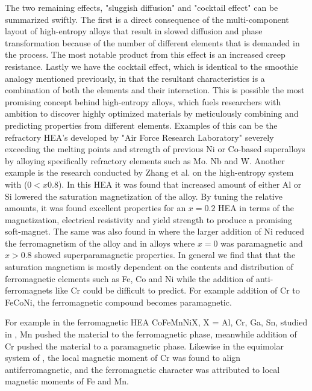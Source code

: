 The two remaining effects, "sluggish diffusion" and "cocktail effect" can be summarized swiftly. The first is a direct consequence of the multi-component layout of high-entropy alloys that result in slowed diffusion and phase transformation because of the number of different elements that is demanded in the process. The most notable product from this effect is an increased creep resistance. Lastly we have the cocktail effect, which is identical to the smoothie analogy mentioned previously, in that the resultant characteristics is a combination of both the elements and their interaction. This is possible the most promising concept behind high-entropy alloys, which fuels researchers with ambition to discover highly optimized materials by meticulously combining and predicting properties from different elements. Examples of this can be the refractory HEA's developed by "Air Force Research Laboratory" severely exceeding the melting points and strength of previous Ni or Co-based superalloys by alloying specifically refractory elements such as Mo. Nb and W. Another example is the research conducted by Zhang et al. on the high-entropy system  with ($0 < x 0.8$). In this HEA it was found that increased amount of either Al or Si lowered the saturation magnetization of the alloy. By tuning the relative amounts, it was found excellent properties for an $x=0.2$ HEA in terms of the magnetization, electrical resistivity and yield strength to produce a promising soft-magnet. The same was also found in  where the larger addition of Ni reduced the ferromagnetism of the alloy and in  alloys where $x = 0$ was paramagnetic and $x > 0.8$ showed superparamagnetic properties. In general we find that that the saturation magnetism is mostly dependent on the contents and distribution of ferromagnetic elements such as Fe, Co and Ni while the addition of anti-ferromagnets like Cr could be difficult to predict. For example addition of Cr to FeCoNi, the ferromagnetic compound becomes paramagnetic. 

For example in the ferromagnetic HEA CoFeMnNiX, X = Al, Cr, Ga, Sn, studied in \cite{ZUO201710}, Mn pushed the material to the ferromagnetic phase, meanwhile addition of Cr pushed the material to a paramagnetic phase. Likewise in the equimolar system of  \cite{PhysRevB.96.014437}, the local magnetic moment of Cr was found to align antiferromagnetic, and the ferromagnetic character was attributed to local magnetic moments of Fe and Mn. 